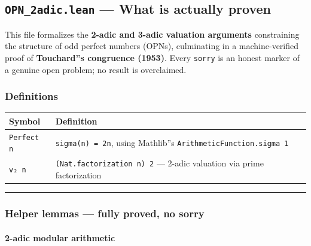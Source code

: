 \documentclass[10pt,a4paper]{article}
\begin{document}
\subsection{\texttt{OPN\_2adic.lean} --- What is actually proven}

This file formalizes the \textbf{2-adic and 3-adic valuation arguments} constraining the structure of
odd perfect numbers (OPNs), culminating in a machine-verified proof of \textbf{Touchard''s congruence
(1953)}. Every \texttt{sorry} is an honest marker of a genuine open problem; no result is overclaimed.

\subsubsection{Definitions}

\begin{table}[htbp]
\centering
\small
{}
\begin{tabularx}{\textwidth}{>{\centering\arraybackslash}X >{\centering\arraybackslash}X}
\toprule
\rowcolor{gray!25}\textbf{Symbol} & \textbf{Definition} \\
\midrule
\rowcolors{1}{white}{gray!10}
\texttt{Perfect n} & \texttt{sigma(n) = 2n}, using Mathlib''s \texttt{ArithmeticFunction.sigma 1} \\
\texttt{v₂ n} & \texttt{(Nat.factorization n) 2} --- 2-adic valuation via prime factorization \\
\bottomrule
\end{tabularx}
\end{table}

\begin{center}
\rule{0.5\textwidth}{0.4pt}
\end{center}

\subsubsection{Helper lemmas --- fully proved, no sorry}

\paragraph{2-adic modular arithmetic}
\end{document}

